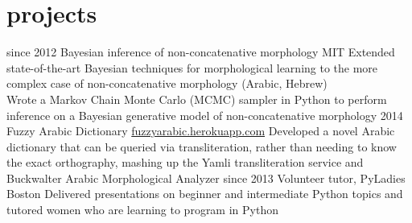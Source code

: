 \documentclass[]{friggeri-cv}
\begin{document}
\section{projects}

\begin{entrylist}
  \entry
    {since 2012}
    {Bayesian inference of non-concatenative morphology}
    {MIT}
    {\Squaredot Extended state-of-the-art Bayesian techniques for morphological learning to the more complex case of non-concatenative morphology (Arabic, Hebrew) \\
    \Squaredot Wrote a Markov Chain Monte Carlo (MCMC) sampler in Python to perform inference on a Bayesian generative model of non-concatenative morphology}
  \entry
    {2014}
    {Fuzzy Arabic Dictionary}
    {\href{http://fuzzyarabic.herokuapp.com}{fuzzyarabic.herokuapp.com}}
    {
    \Squaredot Developed a novel Arabic dictionary that can be queried via transliteration, rather than needing to know the exact orthography, mashing up the Yamli transliteration service and Buckwalter Arabic Morphological Analyzer}
  \entry
    {since 2013}
    {Volunteer tutor, PyLadies Boston}
    {}
    {
    \Squaredot Delivered presentations on beginner and intermediate Python topics and tutored women who are learning to program in Python}
\end{entrylist}
\end{document}
